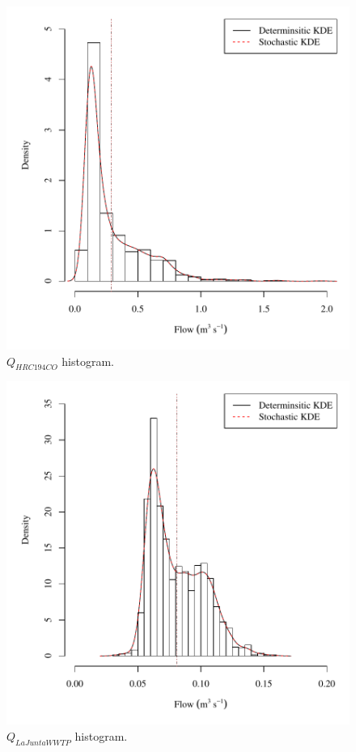 \begin{center}
\begin{figure}[htbp]
	\includegraphics[width=6in]{"Figures/Results_USR/V density qHRC"}
	\caption{$Q_{HRC194CO}$ histogram.}
\end{figure}
\end{center}
\newpage

\begin{center}
\begin{figure}[htbp]
	\includegraphics[width=6in]{"Figures/Results_USR/V density qWTP"}
	\caption{$Q_{LaJuntaWWTP}$ histogram.}
\end{figure}
\end{center}
\newpage

